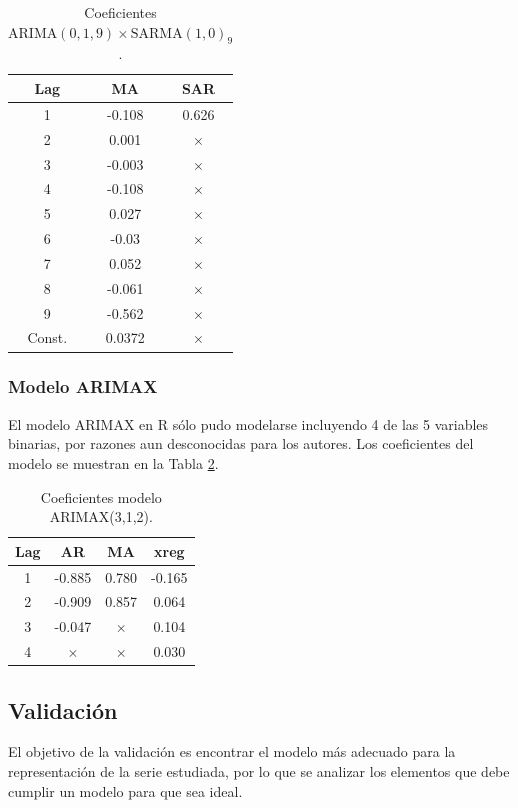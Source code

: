 \documentclass[conference]{IEEEtran}
\begin{document}
\begin{table}[H]
\centering
\caption{Coeficientes $\mathrm{ARIMA}(0,1,9)\times\mathrm{SARMA}(1,0)_9$.}
\label{tab:coefs_sarma}
\begin{tabular}{ccc}
\hline
\textbf{Lag} & \textbf{MA} & \textbf{SAR} \\ \hline
1 & -0.108 & 0.626 \\
2 & 0.001 & $\times$ \\
3 & -0.003 & $\times$ \\
4 & -0.108 & $\times$ \\
5 & 0.027 & $\times$ \\
6 & -0.03 & $\times$ \\
7 & 0.052 & $\times$ \\
8 & -0.061 & $\times$ \\
9 & -0.562 & $\times$ \\
Const. & 0.0372 & $\times$ \\ \hline
\end{tabular}
\end{table}

\subsubsection{Modelo ARIMAX}
El modelo ARIMAX en R sólo pudo modelarse incluyendo 4 de las 5 variables binarias, por razones aun desconocidas para los autores. Los coeficientes del modelo se muestran en la Tabla \ref{tab:coefs_arimax}.

\begin{table}[H]
\centering
\caption{Coeficientes modelo ARIMAX(3,1,2).}
\label{tab:coefs_arimax}
\begin{tabular}{cccc}
\hline
\textbf{Lag} & \textbf{AR} & \textbf{MA} & \textbf{xreg} \\ \hline
1 & -0.885 & 0.780 & -0.165 \\
2 & -0.909 & 0.857 & 0.064 \\
3 & -0.047 & $\times$ & 0.104 \\
4 & $\times$ & $\times$ & 0.030 \\ \hline
\end{tabular}
\end{table}

\subsection{Validación}
El objetivo de la validación  es encontrar el modelo más  adecuado para la representación de la serie estudiada, por lo que se analizar los elementos que debe cumplir un modelo para que sea ideal.
\end{document}
